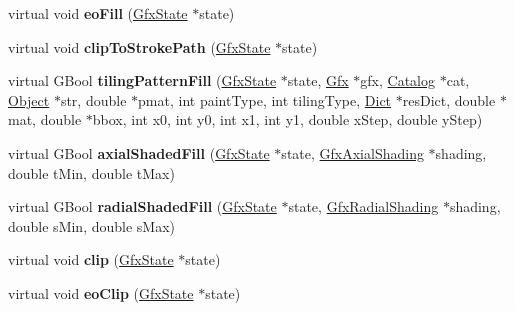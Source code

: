 \begin{DoxyCompactItemize}
virtual void {\bfseries eo\+Fill} (\hyperlink{class_gfx_state}{Gfx\+State} $\ast$state)
\item 
\mbox{\label{class_cairo_image_output_dev_a0d0583b8455aa713f930029e2d641a7a}} 
virtual void {\bfseries clip\+To\+Stroke\+Path} (\hyperlink{class_gfx_state}{Gfx\+State} $\ast$state)
\item 
\mbox{\label{class_cairo_image_output_dev_a6c8b6c62dad5fabaf7d70c79619b1c35}} 
virtual G\+Bool {\bfseries tiling\+Pattern\+Fill} (\hyperlink{class_gfx_state}{Gfx\+State} $\ast$state, \hyperlink{class_gfx}{Gfx} $\ast$gfx, \hyperlink{class_catalog}{Catalog} $\ast$cat, \hyperlink{class_object}{Object} $\ast$str, double $\ast$pmat, int paint\+Type, int tiling\+Type, \hyperlink{class_dict}{Dict} $\ast$res\+Dict, double $\ast$mat, double $\ast$bbox, int x0, int y0, int x1, int y1, double x\+Step, double y\+Step)
\item 
\mbox{\label{class_cairo_image_output_dev_aaf7d1268a0ab3698803e266b56f29909}} 
virtual G\+Bool {\bfseries axial\+Shaded\+Fill} (\hyperlink{class_gfx_state}{Gfx\+State} $\ast$state, \hyperlink{class_gfx_axial_shading}{Gfx\+Axial\+Shading} $\ast$shading, double t\+Min, double t\+Max)
\item 
\mbox{\label{class_cairo_image_output_dev_a654f0c986590e9541732b438c343bb5c}} 
virtual G\+Bool {\bfseries radial\+Shaded\+Fill} (\hyperlink{class_gfx_state}{Gfx\+State} $\ast$state, \hyperlink{class_gfx_radial_shading}{Gfx\+Radial\+Shading} $\ast$shading, double s\+Min, double s\+Max)
\item 
\mbox{\label{class_cairo_image_output_dev_ab77e23502599dd68e7f6a68b9794dd6e}} 
virtual void {\bfseries clip} (\hyperlink{class_gfx_state}{Gfx\+State} $\ast$state)
\item 
\mbox{\label{class_cairo_image_output_dev_a37e459cf608a253e773e201884727660}} 
virtual void {\bfseries eo\+Clip} (\hyperlink{class_gfx_state}{Gfx\+State} $\ast$state)
\item 
\mbox{\label{class_cairo_image_output_dev_af70eef6a48448862f2dc15beb7855d52}} 

\end{DoxyCompactItemize}

